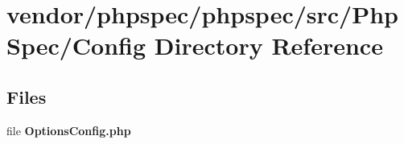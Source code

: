 \section{vendor/phpspec/phpspec/src/\+Php\+Spec/\+Config Directory Reference}
\label{dir_3f39916d5d16db8a9fdafa250b7cc2ab}
\subsection*{Files}
\begin{DoxyCompactItemize}
\item 
file {\bf Options\+Config.\+php}
\end{DoxyCompactItemize}
